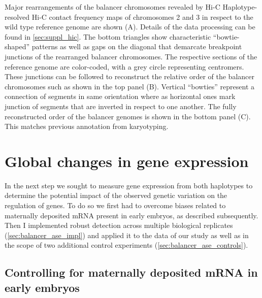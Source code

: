    {Major rearrangements of the balancer chromosomes revealed by Hi-C}{
    Haplotype-resolved Hi-C contact frequency maps of chromosomes 2 and 3 in
    respect to the wild type reference genome are shown (A). Details of the data
    processing can be found in \cref{sec:suppl_hic}. The bottom triangles show
    characteristic ``bowtie-shaped'' patterns as well as gaps on the diagonal
    that demarcate breakpoint junctions of the rearranged balancer chromosomes.
    The respective sections of the reference genome are color-coded, with a grey
    circle representing centromers.
    These junctions can be followed to reconstruct the relative order of the
    balancer chromosomes such as shown in the top panel (B). Vertical ``bowties''
    represent a connection of segments in same orientation where as horizontal
    ones mark junction of segments that are inverted in respect to one another.
    The fully reconstructed order of the balancer genomes is shown in the bottom
    panel (C). This matches previous annotation from
    karyotyping.}









\FloatBarrier
\section{Global changes in gene expression}
\label{sec:balancer_ase}

In the next step we sought to measure gene expression from both haplotypes to
determine the potential impact of the observed genetic variation on the
regulation of genes. To do so we first had to overcome biases related to
maternally deposited mRNA present in early embryos, as described subsequently.
Then I implemented robust \ase detection across multiple biological replicates
(\cref{sec:balancer_ase_impl}) and applied it to the data of our study as well
as in the scope of two additional control experiments
(\cref{sec:balancer_ase_controls}).




\subsection{Controlling for maternally deposited mRNA in early embryos}
\label{sec:balancer_maternal_rna}

